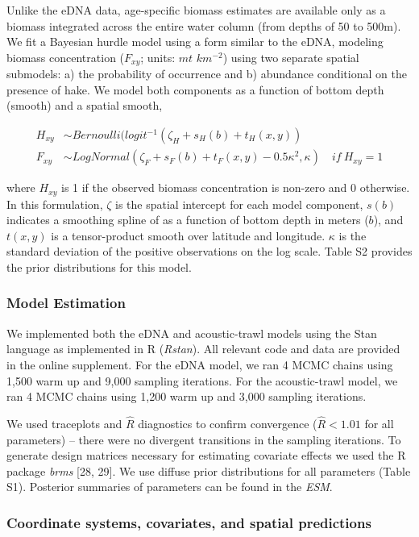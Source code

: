 \documentclass[
]{article}
\begin{document}
Unlike the eDNA data, age-specific biomass estimates are available only
as a biomass integrated across the entire water column (from depths of
50 to 500m). We fit a Bayesian hurdle model using a form similar to the
eDNA, modeling biomass concentration (\(F_{xy}\); units: \(mt\)
\(km^{-2}\)) using two separate spatial submodels: a) the probability of
occurrence and b) abundance conditional on the presence of hake. We
model both components as a function of bottom depth (smooth) and a
spatial smooth,

\begin{align}
  H_{xy} &\sim Bernoulli(logit^{-1}(\zeta_H + s_H(b) + t_H(x,y))\\
  F_{xy} &\sim LogNormal(\zeta_F + s_F(b) + t_F(x,y) - 0.5\kappa^2,\kappa) \quad  if \: H_{xy} = 1
\end{align}

where \(H_{xy}\) is 1 if the observed biomass concentration is non-zero
and 0 otherwise. In this formulation, \(\zeta\) is the spatial intercept
for each model component, \(s(b)\) indicates a smoothing spline of as a
function of bottom depth in meters (\(b\)), and \(t(x,y)\) is a
tensor-product smooth over latitude and longitude. \(\kappa\) is the
standard deviation of the positive observations on the log scale. Table S2 
provides the prior distributions for this model.

\hypertarget{model-estimation}{%
\subsubsection{Model Estimation}\label{model-estimation}}

We implemented both the eDNA and acoustic-trawl models using the Stan
language as implemented in R (\emph{Rstan}). All relevant
code and data are provided in the online supplement. For the eDNA model,
we ran 4 MCMC chains using 1,500 warm up and 9,000 sampling iterations.
For the acoustic-trawl model, we ran 4 MCMC chains using 1,200 warm up
and 3,000 sampling iterations.

We used traceplots and \(\hat{R}\) diagnostics to confirm convergence
(\(\hat{R} < 1.01\) for all parameters) -- there were no divergent
transitions in the sampling iterations. To generate design matrices
necessary for estimating covariate effects we used the R package
\emph{brms}  {[}28, 29{]}. We use diffuse prior distributions for all
parameters (Table S1). Posterior summaries of parameters can be found
in the \emph{ESM}.

\hypertarget{coordinate-systems-covariates-and-spatial-predictions}{%
\subsubsection{Coordinate systems, covariates, and spatial
predictions}\label{coordinate-systems-covariates-and-spatial-predictions}}
\end{document}
